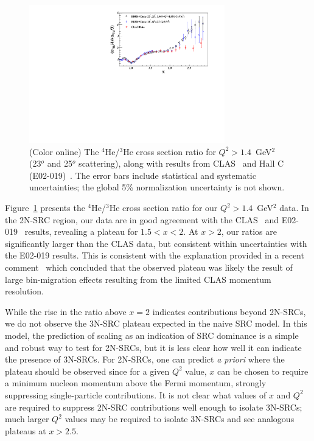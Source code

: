 
                \begin{figure}[!ht]
		\begin{center}
		  \includegraphics[width=8.5cm,angle=0]{He4_He3_XS_Ratio.pdf}
		\end{center}
		\vspace*{-5mm}
		\caption{(Color online) The $^4$He/$^3$He cross section ratio for $Q^2>1.4$~GeV$^2$ (23$^o$ and 25$^o$ scattering),
                  along with results from CLAS~\cite{PhysRevLett.96.082501} and Hall C (E02-019)~\cite{fomin2012}. The error bars include
                  statistical and systematic uncertainties; the global 5\% normalization uncertainty is not shown.}
		\label{fig:ratios_highqsq}
		\end{figure}

Figure~\ref{fig:ratios_highqsq} presents the $^4$He/$^3$He cross section ratio for our $Q^2 > 1.4$~GeV$^2$
data. In the 2N-SRC region, our data are in good agreement with the CLAS~\cite{PhysRevLett.96.082501} and
E02-019~\cite{fomin2012} results, revealing a plateau for $1.5 < x < 2$. At $x>2$, our
ratios are significantly larger than the CLAS data, but consistent within uncertainties with the E02-019
results. This is consistent with the explanation provided in a recent comment~\cite{Higinbotham:2014xna}
which concluded that the observed plateau was likely the result of large bin-migration effects resulting from
the limited CLAS momentum resolution.

While the rise in the ratio above $x=2$ indicates contributions beyond 2N-SRCs, we do not observe the 3N-SRC
plateau expected in the naive SRC model. In this model, the prediction of scaling as an indication of SRC
dominance is a simple and robust way to test for 2N-SRCs, but it is less clear how well it can indicate the
presence of 3N-SRCs. For 2N-SRCs, one can predict \textit{a priori} where the plateau should be observed
since for a given $Q^2$ value, $x$ can be chosen to require a minimum nucleon momentum above the Fermi
momentum, strongly suppressing single-particle contributions. It is not clear what values of $x$ and $Q^2$
are required to suppress 2N-SRC contributions well enough to isolate 3N-SRCs; much larger $Q^2$ values may
be required to isolate 3N-SRCs and see analogous plateaus at $x>2.5$.


